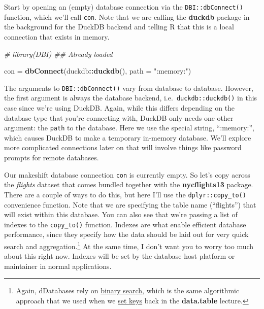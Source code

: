 \documentclass[
]{article}
\newenvironment{Shaded}{\begin{snugshade}}{\end{snugshade}}
\newcommand{\AttributeTok}[1]{\textcolor[rgb]{0.13,0.29,0.53}{#1}}
\newcommand{\CommentTok}[1]{\textcolor[rgb]{0.56,0.35,0.01}{\textit{#1}}}
\newcommand{\FunctionTok}[1]{\textcolor[rgb]{0.13,0.29,0.53}{\textbf{#1}}}
\newcommand{\NormalTok}[1]{#1}
\newcommand{\OtherTok}[1]{\textcolor[rgb]{0.56,0.35,0.01}{#1}}
\newcommand{\SpecialCharTok}[1]{\textcolor[rgb]{0.81,0.36,0.00}{\textbf{#1}}}
\newcommand{\StringTok}[1]{\textcolor[rgb]{0.31,0.60,0.02}{#1}}
\begin{document}
Start by opening an (empty) database connection via the
\texttt{DBI::dbConnect()} function, which we'll call \texttt{con}. Note
that we are calling the \textbf{duckdb} package in the background for
the DuckDB backend and telling R that this is a local connection that
exists in memory.

\begin{Shaded}
\begin{Highlighting}[]
\CommentTok{\# library(DBI) \#\# Already loaded}

\NormalTok{con }\OtherTok{=} \FunctionTok{dbConnect}\NormalTok{(duckdb}\SpecialCharTok{::}\FunctionTok{duckdb}\NormalTok{(), }\AttributeTok{path =} \StringTok{":memory:"}\NormalTok{)}
\end{Highlighting}
\end{Shaded}

The arguments to \texttt{DBI::dbConnect()} vary from database to
database. However, the first argument is always the database backend,
i.e.~\texttt{duckdb::duckdb()} in this case since we're using DuckDB.
Again, while this differs depending on the database type that you're
connecting with, DuckDB only needs one other argument: the \texttt{path}
to the database. Here we use the special string, ``:memory:'', which
causes DuckDB to make a temporary in-memory database. We'll explore more
complicated connections later on that will involve things like password
prompts for remote databases.

Our makeshift database connection \texttt{con} is currently empty. So
let's copy across the \emph{flights} dataset that comes bundled together
with the \textbf{nycflights13} package. There are a couple of ways to do
this, but here I'll use the \texttt{dplyr::copy\_to()} convenience
function. Note that we are specifying the table name (``flights'') that
will exist within this database. You can also see that we're passing a
list of indexes to the \texttt{copy\_to()} function. Indexes are what
enable efficient database performance, since they specify how the data
should be laid out for very quick search and aggregation.\footnote{Again,
  dDatabases rely on
  \href{https://en.wikipedia.org/wiki/Binary_search_algorithm}{binary
  search}, which is the same algorithmic approach that we used when we
  \href{https://raw.githack.com/uo-ec607/lectures/master/05-datatable/05-datatable.html\#keys}{set
  keys} back in the \textbf{data.table} lecture.} At the same time, I
don't want you to worry too much about this right now. Indexes will be
set by the database host platform or maintainer in normal applications.
\end{document}
